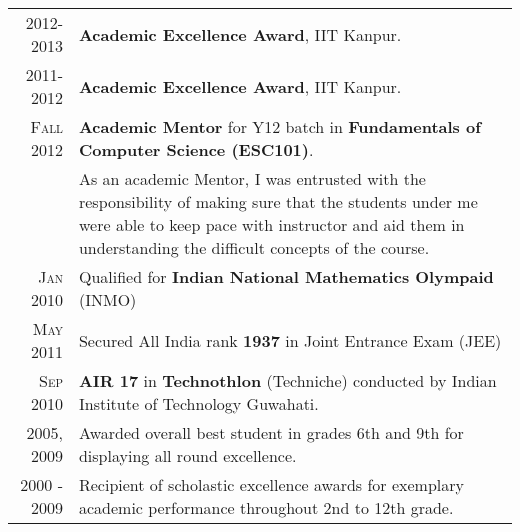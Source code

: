 \documentclass[a4paper,10pt]{article} %
\begin{document}
\begin{tabular}{rp{12cm}}

    \textsc{2012-2013}   & \textbf{Academic Excellence Award}, IIT Kanpur. \\
    \textsc{2011-2012}   & \textbf{Academic Excellence Award}, IIT Kanpur. \\
    \textsc{Fall 2012}   & \textbf{Academic Mentor} for Y12 batch in \textbf{Fundamentals of Computer Science (ESC101)}. \\
                         & \footnotesize{As an academic Mentor, I was entrusted with the responsibility of making sure
                            that the students under me were able to keep pace with instructor and aid them in understanding
                            the difficult concepts of the course. }\\
    \textsc{Jan 2010}    & Qualified for \textbf{Indian National Mathematics Olympaid} (INMO) \\
    \textsc{May 2011}    & Secured All India rank \textbf{1937} in Joint Entrance Exam (JEE) \\
    \textsc{Sep 2010}    & \textbf{AIR 17} in \textbf{Technothlon} (Techniche) conducted by Indian Institute of Technology Guwahati. \\
    \textsc{2005, 2009}  & Awarded overall best student in grades 6th and 9th for displaying all round excellence. \\
    \textsc{2000 - 2009} & Recipient of scholastic excellence awards for exemplary academic performance throughout 2nd to 12th grade. \\

\end{tabular}

\end{document}
